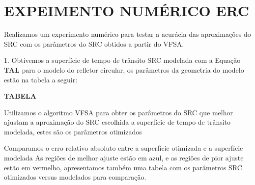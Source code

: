 \chapter{EXPEIMENTO NUMÉRICO ERC}
\label{cap6}

Realizamos um experimento numérico para testar a  acurácia das aproximações do SRC com os parâmetros do SRC obtidos a partir
do VFSA.

1. Obtivemos a superfície de tempo de trânsito SRC modelada com a Equação \textbf{TAL} para o modelo do refletor circular,
os parâmetros da geometria do modelo estão na tabela a seguir:

\textbf{TABELA}

Utilizamos o algoritmo VFSA para obter os parâmetros do SRC que melhor ajustam a aproximação do SRC escolhida a superfície de
tempo de trânsito modelada, estes são os parâmetros otimizados

Comparamos o erro relativo absoluto entre a superfície otimizada e a superfície modelada
As regiões de melhor ajuste estão em azul, e as regiões de pior ajuste estão em vermelho, apresentamos também uma tabela
com os parâmetros SRC otimizados versus modelados para comparação.